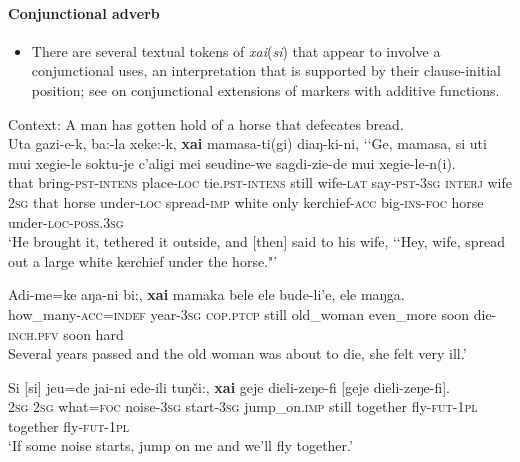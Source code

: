 \paragraph{Conjunctional adverb}\label{appendixUdiheConjunctional}
\largerpage
\begin{itemize}
	\item There are several textual tokens of \mbox{\textit{xai}(\textit{si})} that appear to involve a conjunctional uses, an interpretation that is supported by their clause-initial position; see \textcite{Forker2016} on conjunctional extensions of markers with additive functions.
\end{itemize}

\begin{exe}
	\ex Context: A man has gotten hold of a horse that defecates bread.\\
	\gll Uta gazi-e-k, ba:-la xeke:-k, \textbf{xai} mamasa-ti(gi) diaŋ-ki-ni, \lq\lq{}Ge, mamasa, si uti mui xegie-le soktu-je c’aligi mei seudine-we sagdi-zie-de mui xegie-le-n(i).\\
	that bring-\textsc{pst}-\textsc{intens} place-\textsc{loc} tie.\textsc{pst}-\textsc{intens} still wife-\textsc{lat} say-\textsc{pst}-3\textsc{sg} \phantom{\lq\lq}\textsc{interj} wife 2\textsc{sg} that horse under-\textsc{loc} spread-\textsc{imp} white only kerchief-\textsc{acc} big-\textsc{ins}-\textsc{foc} horse under-\textsc{loc}-\textsc{poss}.3\textsc{sg}\\
	\glt \lq He brought it, tethered it outside, and [then] said to his wife, \lq\lq Hey, wife, spread out a large white kerchief under the horse."' \parencite[92–93, 99]{NikolaevaEtAl2003}

	\ex
	\gll Adi-me=ke aŋa-ni bi:, \textbf{xai} mamaka bele ele bude-li'e, ele maŋga.\\
	how\_many-\textsc{acc}=\textsc{indef} year-3\textsc{sg} \textsc{cop}.\textsc{ptcp} still old\_woman even\_more soon die-\textsc{inch}.\textsc{pfv} soon hard\\
	\glt Several years passed and the old woman was about to die, she felt very ill.\rq{ }\parencite[An old woman and her tiger cub]{NikolaevaEtAl2019}
	
	\ex
	\gll Si \textup{[}si\textup{]} jeu=de jai-ni ede-ili tuŋči:, \textbf{xai} geje dieli-zeŋe-fi \textup{[}geje dieli-zeŋe-fi\textup{]}.\\
	2\textsc{sg} \phantom{[}2\textsc{sg} what=\textsc{foc} noise-3\textsc{sg} start-3\textsc{sg} jump\_on.\textsc{imp} still together fly-\textsc{fut}-1\textsc{pl} \phantom{[}together fly-\textsc{fut}-1\textsc{pl}\\
	\glt \lq If some noise starts, jump on me and we’ll fly together.\rq{ }\parencite[Yegdige in a silk gown]{NikolaevaEtAl2019}
\end{exe}

